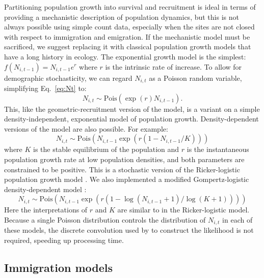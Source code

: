 \documentclass[12pt]{article}
\begin{document}
Partitioning population growth into survival and recruitment
is ideal in terms of providing a mechanistic description of population
dynamics, but this is not always possible using simple count data,
especially when the sites are not closed with respect to immigration
and emigration. %
If the mechanistic model must be sacrificed, we suggest replacing it
with classical population growth models that have a long history in
ecology. The exponential growth model is the simplest: 
$f(N_{i,t-1}) = N_{i,t-1}e^r$ where $r$ is the intrinsic
rate of increase. %
To allow for demographic stochasticity, we can regard $N_{i,t}$ as a Poisson 
random variable, simplifying Eq.~\ref{eq:Nt} to:
\begin{equation}
  N_{i,t} \sim \mathrm{Pois}(\exp(r)N_{i,t-1}).
\label{eq:exp}
\end{equation}
This,
like the geometric-recruitment version of the model, is a variant on a simple
density-independent, exponential model of population growth.
Density-dependent versions of the model are also possible.  For
example:
\begin{equation}
  N_{i,t} \sim \mathrm{Pois}(N_{i,t-1}\exp(r(1-N_{i,t-1}/K)))
\label{eq:rick}
\end{equation}
where $K$ is the stable equilibrium of the population and $r$ is
the
instantaneous population growth rate at low population
densities, and
both parameters are constrained to be positive. This is a
stochastic version
of the Ricker-logistic population growth model
\citep{ricker:1954}. We also
implemented a modified Gompertz-logistic density-dependent
model \citep{hart_gotelli:2011}:
\begin{equation}
N_{i,t} \sim
\mathrm{Pois}(N_{i,t-1}\exp(r(1-\log(N_{i,t-1}+1)/\log(K+1))))
\label{eq:gomp}
\end{equation}
Here the interpretations of $r$ and $K$ are similar to in the
Ricker-logistic model.
Because a single Poisson distribution controls the
distribution of $N_{i,t}$ in each of these models, the discrete
convolution used by \citet{dail_madsen:2011} to construct the likelihood is not required,
speeding up processing time.



\subsection{Immigration models}
\end{document}
